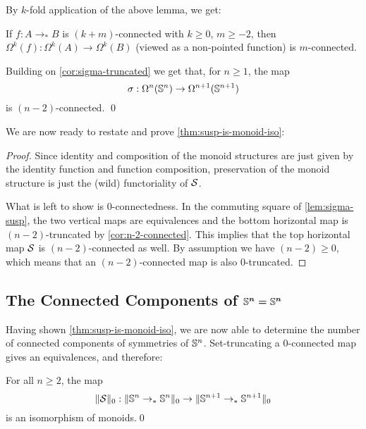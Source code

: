 \documentclass[english,a4]{article}
\begin{document}
By $k$-fold application of the above lemma, we get:
\begin{corollary} \label{cor:n-2-connected}
    If $f : A \to_* B$ is $(k+m)$-connected with $k \geq 0$, $m \geq -2$, then
    $\Omega^k(f) : \Omega^k(A) \to \Omega^k(B)$ (viewed as a non-pointed function) is $m$-connected. 
    
    Building on \cref{cor:sigma-truncated} we get that, for $n \geq 1$, the map
    \begin{equation} 
    \sigma : \Omega^n(\Sn n) \to \Omega^{n+1}(\Sn {n+1})
    \end{equation}
    is $(n-2)$-connected.
    \qed
\end{corollary}

We are now ready to restate and prove \cref{thm:susp-is-monoid-iso}:

\suspiso*
\begin{proof}
    Since identity and composition of the monoid structures are just given by the identity function and function composition,
    preservation of the monoid structure is just the (wild) functoriality of $\susp$.
    
    What is left to show is $0$-connectedness.
    In the commuting square of \cref{lem:sigma-susp}, the two vertical maps are equivalences and the bottom horizontal map is $(n-2)$-truncated by \cref{cor:n-2-connected}.
    This implies that the top horizontal map $\susp$ is $(n-2)$-connected as well.
    By assumption we have $(n-2) \geq 0$, which means that an $(n-2)$-connected map is also $0$-truncated.
\end{proof}

\subsection{The Connected Components of $\boldsymbol{\Sn n = \Sn n}$}

Having shown \cref{thm:susp-is-monoid-iso}, we are now able to determine the number of connected components of symmetries of $\Sn n$.
Set-truncating a $0$-connected map gives an equivalences, and therefore:
\begin{corollary} \label{cor:iso-of-monoids}
    For all $n \geq 2$, the map
    \begin{equation}
    \higherTrunc 0 {\susp} : \higherTrunc 0 {\Sn n \to_* \Sn n} \to \higherTrunc 0 {\Sn {n+1} \to_* \Sn {n+1}}
    \end{equation}
    is an isomorphism of monoids.\qed
\end{corollary}
\end{document}
